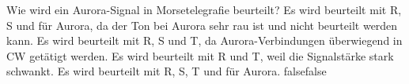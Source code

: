     {Wie wird ein Aurora-Signal in Morsetelegrafie beurteilt?}
    {Es wird beurteilt mit R, S und  für Aurora, da der Ton bei Aurora sehr rau ist und nicht beurteilt werden kann.}
    {Es wird beurteilt mit R, S und T, da Aurora-Verbindungen überwiegend in CW getätigt werden.}
    {Es wird beurteilt mit R und T, weil die Signalstärke stark schwankt.}
    {Es wird beurteilt mit R, S, T und  für Aurora.}
    {false}{false}